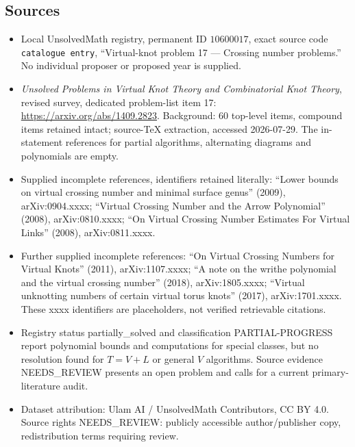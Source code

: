 \documentclass[11pt]{article}
\begin{document}
\subsection{Sources}
\begin{itemize}
\item Local UnsolvedMath registry, permanent ID \(10600017\), exact source code \texttt{catalogue entry}, ``Virtual-knot problem 17 --- Crossing number problems.'' No individual proposer or proposed year is supplied.
\item \emph{Unsolved Problems in Virtual Knot Theory and Combinatorial Knot Theory}, revised survey, dedicated problem-list item 17: \url{https://arxiv.org/abs/1409.2823}. Background: 60 top-level items, compound items retained intact; source-TeX extraction, accessed 2026-07-29. The in-statement references for partial algorithms, alternating diagrams and polynomials are empty.
\item Supplied incomplete references, identifiers retained literally: ``Lower bounds on virtual crossing number and minimal surface genus'' (2009), arXiv:0904.xxxx; ``Virtual Crossing Number and the Arrow Polynomial'' (2008), arXiv:0810.xxxx; ``On Virtual Crossing Number Estimates For Virtual Links'' (2008), arXiv:0811.xxxx.
\item Further supplied incomplete references: ``On Virtual Crossing Numbers for Virtual Knots'' (2011), arXiv:1107.xxxx; ``A note on the writhe polynomial and the virtual crossing number'' (2018), arXiv:1805.xxxx; ``Virtual unknotting numbers of certain virtual torus knots'' (2017), arXiv:1701.xxxx. These xxxx identifiers are placeholders, not verified retrievable citations.
\item Registry status partially\_solved and classification PARTIAL-PROGRESS report polynomial bounds and computations for special classes, but no resolution found for \(T=V+L\) or general \(V\) algorithms. Source evidence NEEDS\_REVIEW presents an open problem and calls for a current primary-literature audit.
\item Dataset attribution: Ulam AI / UnsolvedMath Contributors, CC BY 4.0. Source rights NEEDS\_REVIEW: publicly accessible author/publisher copy, redistribution terms requiring review.
\end{itemize}
\end{document}
